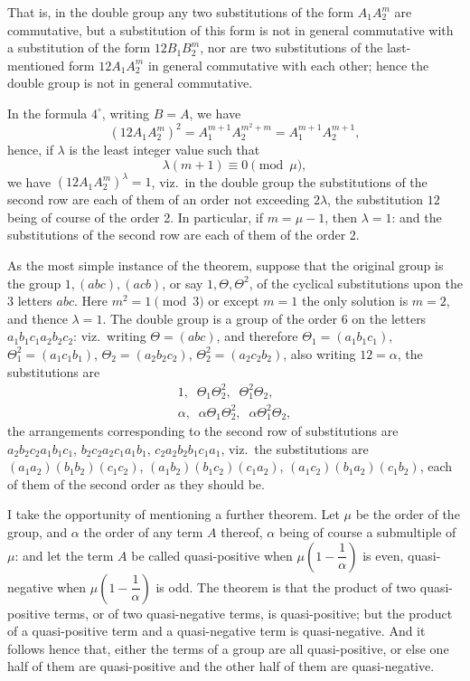 \documentclass[11pt,a4paper]{article}
\begin{document}
That is, in the double group any two substitutions of the form $A_{1}A_{2}^{m}$ are commutative, but a substitution of this form is not in general commutative with a substitution of the form $12B_{1}B_{2}^{m}$, nor are two substitutions of the last-mentioned form $12A_{1}A_{2}^{m}$ in general commutative with each other; hence the double group is not in general commutative.

In the formula $4^{\circ}$, writing $B = A$, we have
\[
(12A_{1}A_{2}^{m})^{2} = A_{1}^{m+1}A_{2}^{m^{2}+m} = A_{1}^{m+1}A_{2}^{m+1},
\]
hence, if $\lambda$ is the least integer value such that
\[
\lambda(m + 1) \equiv 0 \pmod{\mu},
\]
we have $(12A_{1}A_{2}^{m})^{\lambda} = 1$, viz.\ in the double group the substitutions of the second row are each of them of an order not exceeding $2\lambda$, the substitution $12$ being of course of the order 2. In particular, if $m = \mu - 1$, then $\lambda = 1$: and the substitutions of the second row are each of them of the order 2.

\newpage


As the most simple instance of the theorem, suppose that the original group is the group $1, (abc), (acb)$, or say $1, \Theta, \Theta^{2}$, of the cyclical substitutions upon the 3 letters $abc$. Here $m^{2} = 1 \pmod{3}$ or except $m = 1$ the only solution is $m = 2$, and thence $\lambda = 1$. The double group is a group of the order 6 on the letters $a_{1}b_{1}c_{1}a_{2}b_{2}c_{2}$: viz.\ writing $\Theta = (abc)$, and therefore $\Theta_{1} = (a_{1}b_{1}c_{1})$, $\Theta_{1}^{2} = (a_{1}c_{1}b_{1})$, $\Theta_{2} = (a_{2}b_{2}c_{2})$, $\Theta_{2}^{2} = (a_{2}c_{2}b_{2})$, also writing $12 = \alpha$, the substitutions are
\[
\begin{array}{l}
1, \;\; \Theta_{1}\Theta_{2}^{2}, \;\; \Theta_{1}^{2}\Theta_{2},\\[3pt]
\alpha, \;\; \alpha\Theta_{1}\Theta_{2}^{2}, \;\; \alpha\Theta_{1}^{2}\Theta_{2},
\end{array}
\]
the arrangements corresponding to the second row of substitutions are $a_{2}b_{2}c_{2}a_{1}b_{1}c_{1}$, $b_{2}c_{2}a_{2}c_{1}a_{1}b_{1}$, $c_{2}a_{2}b_{2}b_{1}c_{1}a_{1}$, viz.\ the substitutions are $(a_{1}a_{2})(b_{1}b_{2})(c_{1}c_{2})$, $(a_{1}b_{2})(b_{1}c_{2})(c_{1}a_{2})$, $(a_{1}c_{2})(b_{1}a_{2})(c_{1}b_{2})$, each of them of the second order as they should be.

I take the opportunity of mentioning a further theorem. Let $\mu$ be the order of the group, and $\alpha$ the order of any term $A$ thereof, $\alpha$ being of course a submultiple of $\mu$: and let the term $A$ be called quasi-positive when $\mu\!\left(1 - \dfrac{1}{\alpha}\right)$ is even, quasi-negative when $\mu\!\left(1 - \dfrac{1}{\alpha}\right)$ is odd. The theorem is that the product of two quasi-positive terms, or of two quasi-negative terms, is quasi-positive; but the product of a quasi-positive term and a quasi-negative term is quasi-negative. And it follows hence that, either the terms of a group are all quasi-positive, or else one half of them are quasi-positive and the other half of them are quasi-negative.
\end{document}
